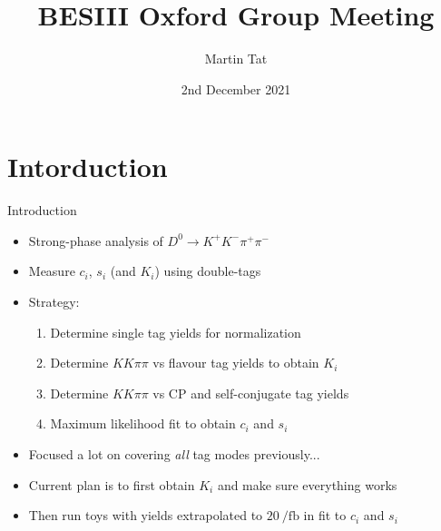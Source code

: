 \documentclass{beamer}
\title[BESIII Oxford]{BESIII Oxford Group Meeting}
\author{Martin Tat}
\institute{Oxford LHCb}
\date{2nd December 2021}
\begin{document}
\begin{frame}
  \titlepage
\end{frame}


\section{Intorduction}
\begin{frame}{Introduction}
  \begin{itemize}
    \setlength\itemsep{1.3em}
    \item{Strong-phase analysis of $D^0\to K^+K^-\pi^+\pi^-$}
    \item{Measure $c_i$, $s_i$ (and $K_i$) using double-tags}
    \item{Strategy:}
    \begin{enumerate}
      \item{Determine single tag yields for normalization}
      \item{Determine $KK\pi\pi$ vs flavour tag yields to obtain $K_i$}
      \item{Determine $KK\pi\pi$ vs CP and self-conjugate tag yields}
      \item{Maximum likelihood fit to obtain $c_i$ and $s_i$}
    \end{enumerate}
    \item{Focused a lot on covering \textit{all} tag modes previously...}
    \item{Current plan is to first obtain $K_i$ and make sure everything works}
    \item{Then run toys with yields extrapolated to $\SI{20}{\per\femto\barn}$ in fit to $c_i$ and $s_i$}
  \end{itemize}
\end{frame}
\end{document}
